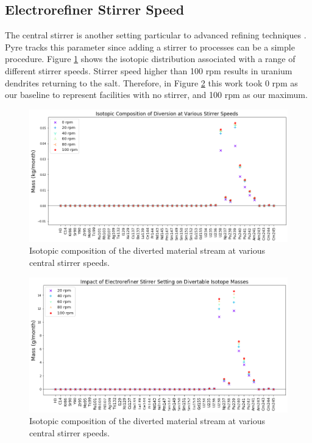 \subsection{Electrorefiner Stirrer Speed}

The central stirrer is another setting particular to advanced refining techniques \cite{lee_advanced_2008}. Pyre tracks this parameter since adding a stirrer to processes can be a simple procedure. Figure \ref{fig:ref-rot-sa} shows the isotopic distribution associated with a
range of different stirrer speeds. Stirrer speed higher than 100 rpm results in uranium dendrites returning
to the salt. Therefore, in Figure \ref{fig:ref-rot-diff} this work took 0 rpm as our baseline to represent facilities with no stirrer, and 100 rpm as our maximum. 

\begin{figure}
	\includegraphics[width=\linewidth]{images/rotation-sa-comp}
	\caption{Isotopic composition of the diverted material stream at various central stirrer speeds.}
	\label{fig:ref-rot-sa}
\end{figure}

\begin{figure}
	\includegraphics[width=\linewidth]{images/rotation-sa-diff}
	\caption{Isotopic composition of the diverted material stream at various central stirrer speeds.}
	\label{fig:ref-rot-diff}
\end{figure}

